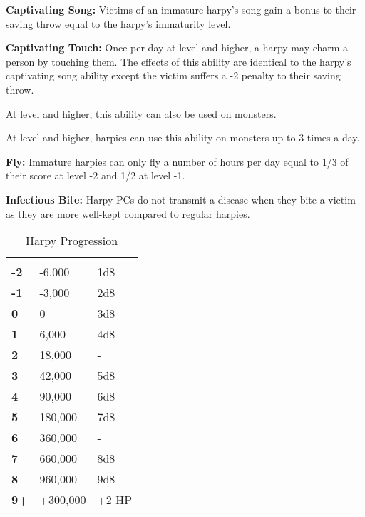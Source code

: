 \begin{multicols*}{2}
\textbf{Captivating Song:} Victims of an immature harpy's song gain a bonus to their saving throw equal to the harpy's immaturity level.

\textbf{Captivating Touch:} Once per day at  level and higher, a harpy may charm a person by touching them. The effects of this ability are identical to the harpy's captivating song ability except the victim suffers a -2 penalty to their saving throw.

At  level and higher, this ability can also be used on monsters. 

At  level and higher, harpies can use this ability on monsters up to 3 times a day.

\textbf{Fly:} Immature harpies can only fly a number of hours per day equal to 1/3 of their  score at level -2 and 1/2 at level -1.

\textbf{Infectious Bite:} Harpy PCs do not transmit a disease when they bite a victim as they are more well-kept compared to regular harpies.


\begin {table}[H]
  \caption{Harpy Progression}
  \begin{tabularx}{\columnwidth}{>{\bfseries}YYY}
	 &  & \\
	-2 & -6,000 & 1d8\\
	-1 & -3,000 & 2d8\\
	0 & 0 & 3d8\\
	1 & 6,000 & 4d8\\
	2 & 18,000 & -\\
	3 & 42,000 & 5d8\\
	4 & 90,000 & 6d8\\
	5 & 180,000 & 7d8\\
	6 & 360,000 & -\\
	7 & 660,000 & 8d8\\
	8 & 960,000 & 9d8\\
	9+ & +300,000 & +2 HP
  \end {tabularx}
\end {table}


\end{multicols*}
